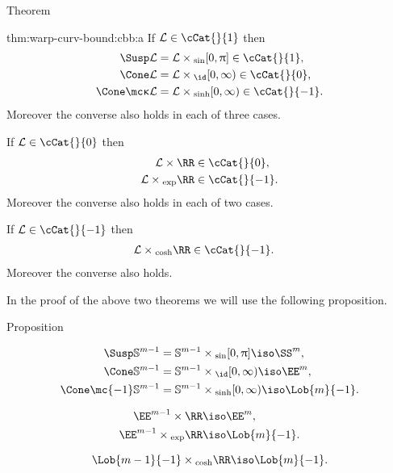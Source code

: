 \begin{thm}{Theorem}\label{thm:warp-curv-bound:cbb}
\begin{subthm}{thm:warp-curv-bound:cbb:a}
If $\spc{L}\in\cCat{}{1}$
then 
\begin{align*}
\Susp\spc{L}&=\spc{L}\times_{\sin}[0,\pi]\in \cCat{}{1},
\\
\Cone\spc{L}&=\spc{L}\times_{\id}[0,\infty)\in \cCat{}{0},
\\
\Cone\mc\kappa\spc{L}&=\spc{L}\times_{\sinh}[0,\infty)\in \cCat{}{-1}.
\end{align*}
Moreover the converse also holds in each of three cases.
\end{subthm}

\begin{subthm}{}
If $\spc{L}\in\cCat{}{0}$
then 
\begin{align*}
\spc{L}\times\RR&\in\cCat{}{0},
\\
\spc{L}\times_{\exp}\RR&\in\cCat{}{-1}.
\end{align*}
Moreover the converse also holds in each of two cases.
\end{subthm}

\begin{subthm}{}
If $\spc{L}\in\cCat{}{-1}$
then 
\begin{align*}
\spc{L}\times_{\cosh}\RR&\in\cCat{}{-1}.
\end{align*}
Moreover the converse also holds.
\end{subthm}
\end{thm}

In the proof of the above two theorems
we will use the following proposition.

\begin{thm}{Proposition}\label{prop:warp-examples}

\begin{subthm}{}
\begin{align*}
\Susp\mathbb S^{m-1}&=\mathbb S^{m-1}\times_{\sin}[0,\pi]\iso\SS^m,
\\
\Cone\mathbb S^{m-1}&=\mathbb S^{m-1}\times_{\id}[0,\infty)\iso\EE^m,
\\
\Cone\mc{-1}\mathbb S^{m-1}&=\mathbb S^{m-1}\times_{\sinh}[0,\infty)\iso\Lob{m}{-1}.
\end{align*}
\end{subthm}



\begin{subthm}{}
\begin{align*}
\EE^{m-1}\times\RR&\iso\EE^{m},
\\
\EE^{m-1}\times_{\exp}\RR&\iso\Lob{m}{-1}.
\end{align*}
\end{subthm}

\begin{subthm}{}
\[\Lob{m-1}{-1}\times_{\cosh}\RR\iso\Lob{m}{-1}.\]
\end{subthm}

\end{thm}

